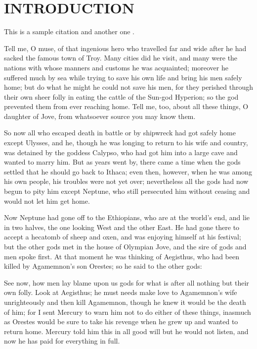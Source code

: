 \chapter{INTRODUCTION}
    This is a sample citation \cite{lopez2013} and another one \cite{lopez2013,thies2006}.

    Tell me, O muse, of that ingenious hero who travelled far and wide after he had sacked the famous town of Troy. Many cities did he visit, and many were the nations with whose manners and customs he was acquainted; moreover he suffered much by sea while trying to save his own life and bring his men safely home; but do what he might he could not save his men, for they perished through their own sheer folly in eating the cattle of the Sun-god Hyperion; so the god prevented them from ever reaching home. Tell me, too, about all these things, O daughter of Jove, from whatsoever source you may know them.

    So now all who escaped death in battle or by shipwreck had got safely home except Ulysses, and he, though he was longing to return to his wife and country, was detained by the goddess Calypso, who had got him into a large cave and wanted to marry him. But as years went by, there came a time when the gods settled that he should go back to Ithaca; even then, however, when he was among his own people, his troubles were not yet over; nevertheless all the gods had now begun to pity him except Neptune, who still persecuted him without ceasing and would not let him get home.

    Now Neptune had gone off to the Ethiopians, who are at the world's end, and lie in two halves, the one looking West and the other East. He had gone there to accept a hecatomb of sheep and oxen, and was enjoying himself at his festival; but the other gods met in the house of Olympian Jove, and the sire of gods and men spoke first. At that moment he was thinking of Aegisthus, who had been killed by Agamemnon's son Orestes; so he said to the other gods:

    See now, how men lay blame upon us gods for what is after all nothing but their own folly. Look at Aegisthus; he must needs make love to Agamemnon's wife unrighteously and then kill Agamemnon, though he knew it would be the death of him; for I sent Mercury to warn him not to do either of these things, inasmuch as Orestes would be sure to take his revenge when he grew up and wanted to return home. Mercury told him this in all good will but he would not listen, and now he has paid for everything in full.

